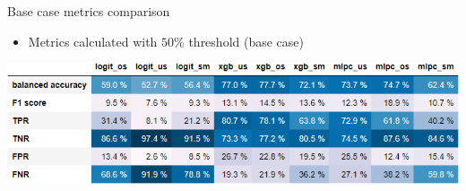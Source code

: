 \documentclass{beamer}
\begin{document}
\begin{frame}{Base case metrics comparison}

\begin{itemize}
\item Metrics calculated with $50$\% threshold (base case)
\end{itemize}

\begin{center}
\includegraphics[scale=0.6]{img/balance_acc_table.png}
\end{center}
\end{frame}
\end{document}
